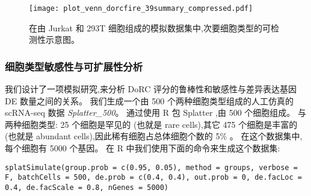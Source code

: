 \begin{figure}[!htbp]
    \centering
    \texttt{[image: plot\_venn\_dorcfire\_39summary\_compressed.pdf]}
    \caption{
    在由 Jurkat 和 293T 细胞组成的模拟数据集中,次要细胞类型的可检测性示意图。
    }
    \label{fig:jurkat}
\end{figure}

\subsubsection{细胞类型敏感性与可扩展性分析}


我们设计了一项模拟研究,来分析 DoRC 评分的鲁棒性和敏感性与差异表达基因 DE 数量之间的关系。
我们生成一个由 500 个两种细胞类型组成的人工仿真的 scRNA-seq 数据 \textit{Splatter\_500}。
通过使用 R 包 Splatter \cite{zappia2017splatter},由 500 个细胞组成。
与两种细胞类型: 25 个细胞是罕见的 (也就是 rare cells),其它 475 个细胞是丰富的 (也就是 abundant cells),因此稀有细胞占总体细胞个数的 5\% 。
在这个数据集中,每个细胞有 5000 个基因。
在 R 中我们使用下面的命令来生成这个数据集:

\texttt{splatSimulate(group.prob = c(0.95, 0.05), method = groups, 
verbose = F, batchCells = 500, de.prob = c(0.4, 0.4), out.prob = 0, 
de.facLoc = 0.4, de.facScale = 0.8, nGenes = 5000)}

